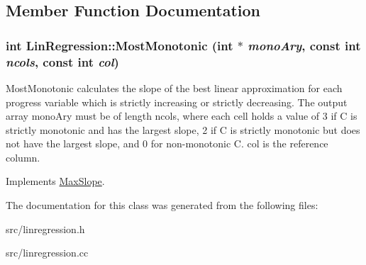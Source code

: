 \subsection{Member Function Documentation}
\hypertarget{classLinRegression_a1f245c4e47637f3f1d94f6129861406d}{
\subsubsection[{MostMonotonic}]{\setlength{\rightskip}{0pt plus 5cm}int LinRegression::MostMonotonic (int $\ast$ {\em monoAry}, \/  const int {\em ncols}, \/  const int {\em col})}}
\label{de/d89/classLinRegression_a1f245c4e47637f3f1d94f6129861406d}
MostMonotonic calculates the slope of the best linear approximation for each progress variable which is strictly increasing or strictly decreasing. The output array monoAry must be of length ncols, where each cell holds a value of 3 if C is strictly monotonic and has the largest slope, 2 if C is strictly monotonic but does not have the largest slope, and 0 for non-\/monotonic C. col is the reference column. 

Implements \hyperlink{classMaxSlope}{MaxSlope}.

The documentation for this class was generated from the following files:\begin{DoxyCompactItemize}
\item 
src/linregression.h\item 
src/linregression.cc\end{DoxyCompactItemize}

